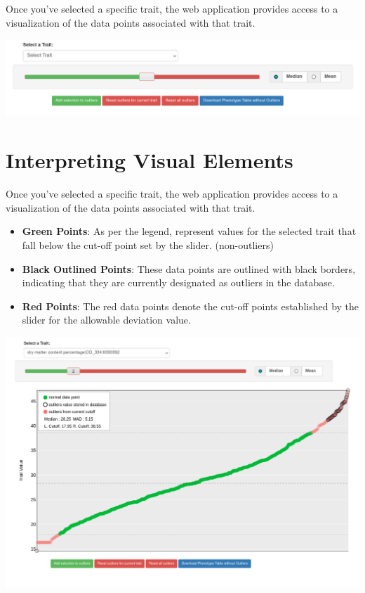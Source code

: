 \documentclass[
  12pt,
]{book}
\providecommand{\tightlist}{%
  \setlength{\itemsep}{0pt}\setlength{\parskip}{0pt}}
\begin{document}
Once you've selected a specific trait, the web application provides access to a visualization of the data points associated with that trait.

\begin{center}\includegraphics[width=0.95\linewidth]{assets/images/outliers_dataset_basic_panel} \end{center}

\hypertarget{interpreting-visual-elements}{%
\section{Interpreting Visual Elements}\label{interpreting-visual-elements}}

Once you've selected a specific trait, the web application provides access to a visualization of the data points associated with that trait.

\begin{itemize}
\tightlist
\item
  \textbf{Green Points}: As per the legend, represent values for the selected trait that fall below the cut-off point set by the slider. (non-outliers)
\item
  \textbf{Black Outlined Points}: These data points are outlined with black borders, indicating that they are currently designated as outliers in the database.
\item
  \textbf{Red Points}: The red data points denote the cut-off points established by the slider for the allowable deviation value.
\end{itemize}

\begin{center}\includegraphics[width=0.95\linewidth]{assets/images/outliers_dataset_full_visualisation} \end{center}
\end{document}
